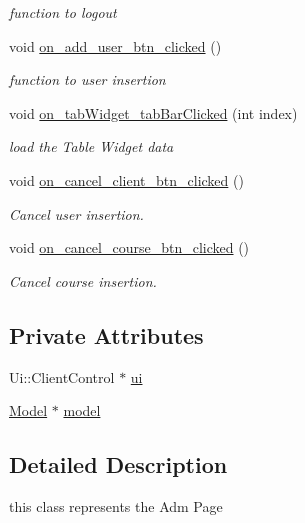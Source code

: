 \begin{DoxyCompactItemize}
\begin{DoxyCompactList}\small\item\em function to logout \end{DoxyCompactList}\item 
void \hyperlink{classClientControl_a727cca41aa894d4cf371cfbba6f961d1}{on\+\_\+add\+\_\+user\+\_\+btn\+\_\+clicked} ()
\begin{DoxyCompactList}\small\item\em function to user insertion \end{DoxyCompactList}\item 
void \hyperlink{classClientControl_a5a380eab783cb0fc1760417956cec0d5}{on\+\_\+tab\+Widget\+\_\+tab\+Bar\+Clicked} (int index)
\begin{DoxyCompactList}\small\item\em load the Table Widget data \end{DoxyCompactList}\item 
void \hyperlink{classClientControl_a8a46c9d7c91c26e0f4b779452cea8208}{on\+\_\+cancel\+\_\+client\+\_\+btn\+\_\+clicked} ()
\begin{DoxyCompactList}\small\item\em Cancel user insertion. \end{DoxyCompactList}\item 
void \hyperlink{classClientControl_a4771dbff3cfafb5d34d55a009cb073ff}{on\+\_\+cancel\+\_\+course\+\_\+btn\+\_\+clicked} ()
\begin{DoxyCompactList}\small\item\em Cancel course insertion. \end{DoxyCompactList}\end{DoxyCompactItemize}
\subsection*{Private Attributes}
\begin{DoxyCompactItemize}
\item 
Ui\+::\+Client\+Control $\ast$ \hyperlink{classClientControl_adea5f2cf529bedcc7d2aac9e2702d702}{ui}
\item 
\hyperlink{classModel}{Model} $\ast$ \hyperlink{classClientControl_a58fe6ae8049d307caa62f164a8c07eed}{model}
\end{DoxyCompactItemize}


\subsection{Detailed Description}
this class represents the Adm Page 

